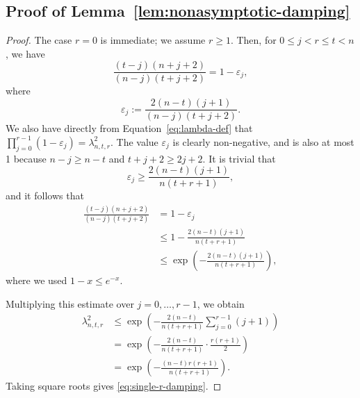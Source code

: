 \documentclass[manuscript,nonacm]{acmart}
\begin{document}
\subsection{Proof of Lemma~\ref{lem:nonasymptotic-damping}}
\begin{proof}
The case $r=0$ is immediate; we assume $r\geq 1$. Then, for \(0\le j< r\leq t<n\), we have
\[
    \frac{(t-j)(n+j+2)}{(n-j)(t+j+2)}
    =
    1-\varepsilon_j,
\]
where
\[
    \varepsilon_j
    :=
    \frac{2(n-t)(j+1)}
         {(n-j)(t+j+2)}.
\]
We also have directly from Equation~\ref{eq:lambda-def} that $\prod_{j=0}^{r-1}(1-\varepsilon_j)=\lambda^2_{n,t,r}$.
The value $\varepsilon_j$ is clearly non-negative, and is also at most 1 because $n-j\geq n-t$ and $t+j+2\geq2j+2$.
It is trivial that  
\[
    \varepsilon_j
    \ge
    \frac{2(n-t)(j+1)}
         {n(t+r+1)},
\]
and it follows that
\[
\begin{aligned}
    \frac{(t-j)(n+j+2)}{(n-j)(t+j+2)}
    &=
    1-\varepsilon_j                                                        \\
    &\le
    1-
    \frac{2(n-t)(j+1)}
         {n(t+r+1)}                                                    \\
    &\le
    \exp\!\left(
        -
        \frac{2(n-t)(j+1)}
             {n(t+r+1)}
    \right),
\end{aligned}
\]
where we used \(1-x\le e^{-x}\).

Multiplying this estimate over \(j=0,\dots,r-1\), we obtain
\[
\begin{aligned}
    \lambda_{n,t,r}^{2}
    &\le
    \exp\!\left(
        -
        \frac{2(n-t)}
             {n(t+r+1)}
        \sum_{j=0}^{r-1}(j+1)
    \right)                                                        \\
    &=
    \exp\!\left(
        -
        \frac{2(n-t)}
             {n(t+r+1)}
        \cdot
        \frac{r(r+1)}2
    \right)                                                        \\
    &=
    \exp\!\left(
        -
        \frac{(n-t)r(r+1)}
             {n(t+r+1)}
    \right).
\end{aligned}
\]
Taking square roots gives \eqref{eq:single-r-damping}.
\end{proof}
\end{document}
